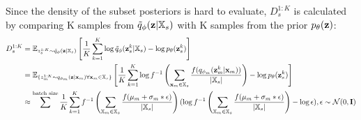 Since the density of the subset posteriors is hard to evaluate, $D^{1:K}_s$ is calculated by comparing K samples from $\tilde{q}_{\phi}(\textbf{z}|\mathbb{X}_s)$ with K samples from the prior $p_{\theta}(\textbf{z})$:
\begin{equation}
    \begin{split}
        D^{1:K}_s &=  \mathbb{E}_{z^{1:K}_s \sim \tilde{q}_{\phi}(\textbf{z}|\mathbb{X}_s)} \left[ \frac{1}{K} \sum _{k=1}^K \log \tilde{q}_{\phi}(\textbf{z}^k _s|\mathbb{X}_s) - \log p_{\theta}(\textbf{z}^k _s) \right]\\
        &=     \mathbb{E}_{\{z^{1:K}_m \sim q_{\phi_m}(\textbf{z}|\textbf{x}_m) \forall \textbf{x}_m \in \mathbb{X}_s\}} \left[ \frac{1}{K} \sum _{k=1}^K \log f^{-1}\left(\sum _{\textbf{x}_m \in \mathbb{X}_s} \frac{f(q_{\phi_m}(\textbf{z}_m^k|\textbf{x}_m))}{|\mathbb{X}_s|}\right) - \log p_{\theta}(\textbf{z}^k _s) \right] \label{eq:samplestep}\\
        &\approx \sum ^{\text{batch size}} \frac{1}{K} \sum _{k=1}^K f^{-1}\left(\sum _{\mathbb{X}_m \in \mathbb{X}_s} \frac{f(\mu_m+\sigma_m\ast \epsilon)}{|\mathbb{X}_s|}\right)(  \log f^{-1}\left(\sum _{\mathbb{X}_m \in \mathbb{X}_s} \frac{f(\mu_m+\sigma_m\ast \epsilon)}{|\mathbb{X}_s|}\right) - \log \epsilon), \epsilon \sim \mathcal{N}(0,\textbf{I})
    \end{split}
\end{equation}

%





